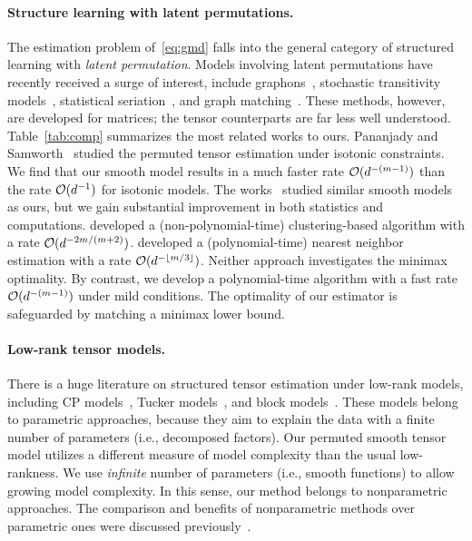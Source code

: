 \documentclass[12pt]{article}
\theoremstyle{definition}
\begin{document}
\paragraph{Structure learning with latent permutations.} The estimation problem of~\eqref{eq:gmd} falls into the general category of structured learning with \emph{latent permutation}. Models involving latent permutations have recently received a surge of interest, include graphons~\citep{chan2014consistent,klopp2017oracle}, stochastic transitivity models~\citep{chatterjee2015matrix,shah2019low}, statistical seriation~\citep{flammarion2019optimal,hutter2020estimation}, and graph matching~\citep{ding2021efficient,livi2013graph}. These methods, however, are developed for matrices; the tensor counterparts are far less well understood. Table~\ref{tab:comp} summarizes the most related works to ours. Pananjady and Samworth~\cite{pananjady2020isotonic} studied the permuted tensor estimation under isotonic constraints.  We find that our smooth model results in a much faster rate $\mathcal{O}(d^{-(m-1)})$ than the rate $\mathcal{O}(d^{-1})$ for isotonic models. The works~\cite{balasubramanian2021nonparametric,li2019nearest} studied similar smooth models as ours, but we gain substantial improvement in both statistics and computations. \citet{balasubramanian2021nonparametric} developed a (non-polynomial-time) clustering-based algorithm with a rate $\mathcal{O}(d^{-2m/(m+2)})$. \citet{li2019nearest} developed a (polynomial-time) nearest neighbor estimation with a rate $\mathcal{O}(d^{-\lfloor m/3\rfloor})$. Neither approach investigates the minimax optimality. By contrast, we develop a polynomial-time algorithm with a fast rate $\mathcal{O}(d^{-(m-1)})$ under mild conditions. The optimality of our estimator is safeguarded by matching a minimax lower bound. 


\paragraph{Low-rank tensor models.} There is a huge literature on structured tensor estimation under low-rank models, including CP models~\cite{kolda2009tensor,sun2017provable}, Tucker models~\cite{zhang2018tensor}, and block models~\cite{wang2019multiway}. These models belong to parametric approaches, because they aim to explain the data with a finite number of parameters (i.e., decomposed factors). Our permuted smooth tensor model utilizes a different measure of model complexity than the usual low-rankness. We use \emph{infinite} number of parameters (i.e., smooth functions) to allow growing model complexity. In this sense, our method belongs to nonparametric approaches. The comparison and benefits of nonparametric methods over parametric ones were discussed previously~\cite{pananjady2020isotonic,li2019nearest,gao2015rate,bickel2009nonparametric,shah2019low}.  
 
\end{document}
